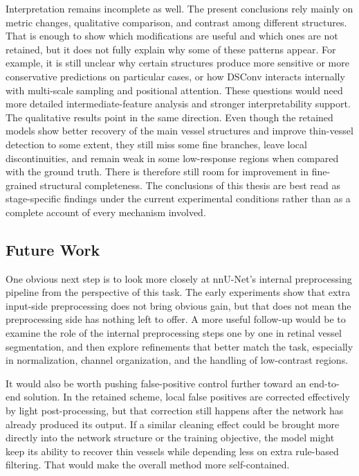 \documentclass[a4paper,11pt]{article}
\begin{document}
Interpretation remains incomplete as well. The present conclusions rely mainly on metric changes, qualitative comparison, and contrast among different structures. That is enough to show which modifications are useful and which ones are not retained, but it does not fully explain why some of these patterns appear. For example, it is still unclear why certain structures produce more sensitive or more conservative predictions on particular cases, or how DSConv interacts internally with multi-scale sampling and positional attention. These questions would need more detailed intermediate-feature analysis and stronger interpretability support. The qualitative results point in the same direction. Even though the retained models show better recovery of the main vessel structures and improve thin-vessel detection to some extent, they still miss some fine branches, leave local discontinuities, and remain weak in some low-response regions when compared with the ground truth. There is therefore still room for improvement in fine-grained structural completeness. The conclusions of this thesis are best read as stage-specific findings under the current experimental conditions rather than as a complete account of every mechanism involved.

\subsection{Future Work}
One obvious next step is to look more closely at nnU-Net's internal preprocessing pipeline from the perspective of this task. The early experiments show that extra input-side preprocessing does not bring obvious gain, but that does not mean the preprocessing side has nothing left to offer. A more useful follow-up would be to examine the role of the internal preprocessing steps one by one in retinal vessel segmentation, and then explore refinements that better match the task, especially in normalization, channel organization, and the handling of low-contrast regions.

It would also be worth pushing false-positive control further toward an end-to-end solution. In the retained scheme, local false positives are corrected effectively by light post-processing, but that correction still happens after the network has already produced its output. If a similar cleaning effect could be brought more directly into the network structure or the training objective, the model might keep its ability to recover thin vessels while depending less on extra rule-based filtering. That would make the overall method more self-contained.
\end{document}
